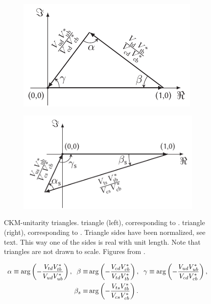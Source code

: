 \begin{figure}[t]
  \centering
  \begin{subfigure}{0.475\textwidth}
    \raggedright
    \includegraphics[width=\textwidth]{Figures/Chapter1/b-d-triangle}
    \caption{}
    \label{unitTriangles_bd}
  \end{subfigure}%
  \hfill%
  \begin{subfigure}{0.525\textwidth}
    \raggedleft
    \includegraphics[width=\textwidth]{Figures/Chapter1/b-s-triangle}
    \caption{}
    \label{unitTriangles_bs}
  \end{subfigure}
  \caption{CKM-unitarity triangles. \Bd triangle (left), corresponding to . \Bs triangle (right),
           corresponding to . Triangle sides have been normalized, see text.
           This way one of the sides is real with unit length. Note that triangles are not drawn to scale. Figures from \cite{jeroenThesis}. }
  \label{unitTriangles}
\end{figure}

\begin{align}
  \centering
  \alpha \equiv \arg\left( -\frac{\Vtd\Vtb^*}{\Vud\Vub^*} \right),
  \;\;
  \beta  \equiv & \arg\left( -\frac{\Vcd\Vcb^*}{\Vtd\Vtb^*} \right),
  \;\;
  \gamma \equiv \arg\left( -\frac{\Vud\Vub^*}{\Vcd\Vcb^*} \right), \nonumber \\
  \betas \equiv & \arg\left( -\frac{\Vts\Vtb^*}{\Vcs\Vcb^*} \right).
  \label{ckm_angles_def}
\end{align}


